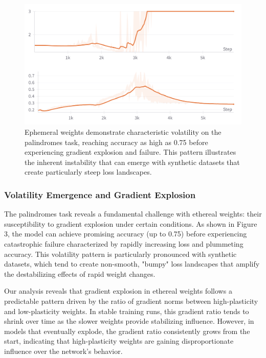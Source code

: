 \documentclass{article} %
\begin{document}
\begin{figure}[h]
\begin{center}
\includegraphics[width=0.8\linewidth]{figure_3.png}
\caption{Ephemeral weights demonstrate characteristic volatility on the palindromes task, reaching accuracy as high as 0.75 before experiencing gradient explosion and failure. This pattern illustrates the inherent instability that can emerge with synthetic datasets that create particularly steep loss landscapes.}
\label{fig:palindromes}
\end{center}
\end{figure}

\subsubsection{Volatility Emergence and Gradient Explosion}

The palindromes task reveals a fundamental challenge with ethereal weights: their susceptibility to gradient explosion under certain conditions. As shown in Figure 3, the model can achieve promising accuracy (up to 0.75) before experiencing catastrophic failure characterized by rapidly increasing loss and plummeting accuracy. This volatility pattern is particularly pronounced with synthetic datasets, which tend to create non-smooth, "bumpy" loss landscapes that amplify the destabilizing effects of rapid weight changes.

Our analysis reveals that gradient explosion in ethereal weights follows a predictable pattern driven by the ratio of gradient norms between high-plasticity and low-plasticity weights. In stable training runs, this gradient ratio tends to shrink over time as the slower weights provide stabilizing influence. However, in models that eventually explode, the gradient ratio consistently grows from the start, indicating that high-plasticity weights are gaining disproportionate influence over the network's behavior.
\end{document}
